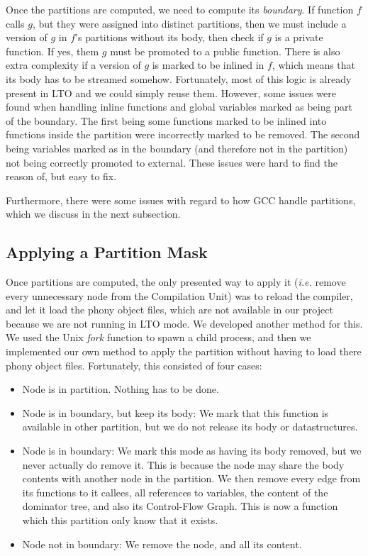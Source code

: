 \documentclass[runningheads]{llncs}
\begin{document}
Once the partitions are computed, we need to compute its \textit{boundary}.
If function $f$ calls $g$, but they were assigned into distinct partitions,
then we must include a version of $g$ in $f$'s partitions without its body,
then check if $g$ is a private function. If yes, them $g$ must be promoted
to a public function. There is also extra complexity if a version of $g$
is marked to be inlined in $f$, which means that its body has to be
streamed somehow. Fortunately, most of this logic is already present
in LTO and we could simply reuse them. However, some issues were found
when handling inline functions and global variables marked as being part
of the boundary. The first being some functions marked to be inlined into 
functions inside the partition were incorrectly marked to be removed.
The second being variables marked as in the boundary (and therefore
not in the partition) not being correctly promoted to external. These issues
were hard to find the reason of, but easy to fix.

Furthermore, there were some issues with
regard to how GCC handle partitions, which we discuss in the next subsection.

\subsection{Applying a Partition Mask}\label{sec:partition_mask}

Once partitions are computed, the only presented way to apply it (\textit{i.e.}
remove every unnecessary node from the Compilation Unit) was to reload the
compiler, and let it load the phony object files, which are not available in our
project because we are not running in LTO mode. We developed another method for this.
We used the Unix \textit{fork} function to spawn a child process, and then
we implemented our own method to apply the partition without having to load
there phony object files. Fortunately, this consisted
of four cases:
\begin{itemize}
	\item Node is in partition. Nothing has to be done.
	\item Node is in boundary, but keep its body: We mark that this function
	is available in other partition, but we do not release its body or
	datastructures.
	\item Node is in boundary: We mark this mode as having its body removed,
	but we never actually do remove it. This is because the node may share the
	body contents with another node in the partition. We then remove
	every edge from its functions to it callees, all references to variables,
	the content of the dominator tree, and also its Control-Flow Graph. This
	is now a function which this partition only know that it exists.
	\item Node not in boundary: We remove the node, and all its content.
\end{itemize}
\end{document}
